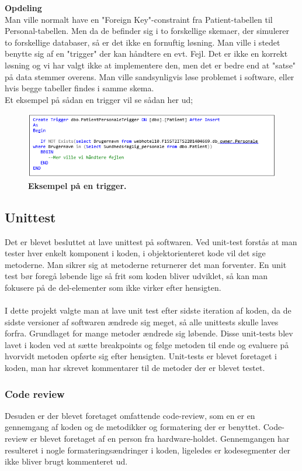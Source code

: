 \textbf{Opdeling}\\
Man ville normalt have en "Foreign Key"-constraint fra Patient-tabellen til Personal-tabellen. Men da de befinder sig i to forskellige skemaer, der simulerer to forskellige databaser, så er det ikke en fornuftig løsning. Man ville i stedet benytte sig af en "trigger" der kan håndtere en evt. Fejl. Det er ikke en korrekt løsning og vi har valgt ikke at implementere den, men det er bedre end at "satse" på data stemmer overens. Man ville sandsynligvis løse problemet i software, eller hvis begge tabeller findes i samme skema. \\
Et eksempel på sådan en trigger vil se sådan her ud;
\begin{figure}[H]
\includegraphics[width =1.0\textwidth , center]{billeder/database_kode}
\caption{\textbf{Eksempel på en trigger.}}
\end{figure}
\subsection{Unittest}
Det er blevet besluttet at lave unittest på softwaren. Ved unit-test forstås at man tester hver enkelt komponent i koden, i objektorienteret kode vil det sige metoderne. Man sikrer sig at metoderne returnerer det man forventer. En unit test bør foregå løbende lige så frit som koden bliver udviklet, så kan man fokusere på de del-elementer som ikke virker efter hensigten. \\\\
I dette projekt valgte man at lave unit test efter sidste iteration af koden, da de sidste versioner af softwaren ændrede sig meget, så alle unittests skulle laves forfra. Grundlaget for mange metoder ændrede sig løbende. Disse unit-tests blev lavet i koden ved at sætte breakpoints og følge metoden til ende og evaluere på hvorvidt metoden opførte sig efter hensigten. Unit-tests er blevet foretaget i koden, man har skrevet kommentarer til de metoder der er blevet testet.
\subsubsection{Code review}
Desuden er der blevet foretaget omfattende code-review, som en er en gennemgang af koden og de metodikker og formatering der er benyttet. Code-review er blevet foretaget af en person fra hardware-holdet. Gennemgangen har resulteret i nogle formateringsændringer i koden, ligeledes er kodesegmenter der ikke bliver brugt kommenteret ud.
